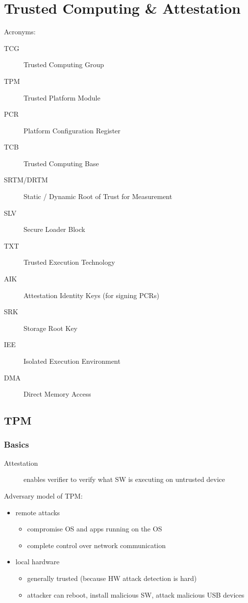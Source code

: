 
\section{Trusted Computing \& Attestation}
Acronyms:
\begin{description}
    \item[TCG] Trusted Computing Group
    \item[TPM] Trusted Platform Module
    \item[PCR] Platform Configuration Register
    \item[TCB] Trusted Computing Base
    \item[SRTM/DRTM] Static / Dynamic Root of Trust for Measurement
    \item[SLV] Secure Loader Block
    \item[TXT] Trusted Execution Technology
    \item[AIK] Attestation Identity Keys (for signing PCRs)
    \item[SRK] Storage Root Key
    \item[IEE] Isolated Execution Environment
    \item[DMA] Direct Memory Access
\end{description}
\subsection{TPM}
\subsubsection{Basics}
\begin{description}
    \item[Attestation] enables verifier to verify what SW is executing on untrusted device
\end{description}
Adversary model of TPM:
\begin{itemize}
    \item remote attacks 
        \begin{itemize}
            \item compromise OS and apps running on the OS
            \item complete control over network communication
        \end{itemize}
    \item local hardware
        \begin{itemize}
            \item generally trusted (because HW attack detection is hard)
            \item attacker can reboot, install malicious SW, attack malicious USB devices
        \end{itemize}
\end{itemize}

